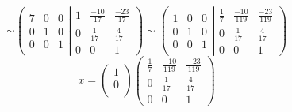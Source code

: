 \documentclass{article}
\begin{document}
\[
    \sim
    \left(\begin{array}{ccc}
            7 & 0 & 0 \\
            0 & 1 & 0 \\
            0 & 0 & 1
        \end{array}\left|
    \begin{array}{ccc}
            1 & \frac{-10}{17} & \frac{-23}{17} \\
            0 & \frac{1}{17}   & \frac{4}{17}   \\
            0 & 0              & 1
        \end{array}\right.
    \right)
    \sim
    \left(\begin{array}{ccc}
            1 & 0 & 0 \\
            0 & 1 & 0 \\
            0 & 0 & 1
        \end{array}\left|
    \begin{array}{ccc}
            \frac{1}{7} & \frac{-10}{119} & \frac{-23}{119} \\
            0           & \frac{1}{17}    & \frac{4}{17}    \\
            0           & 0               & 1
        \end{array}\right.
    \right)
\]
\[
    x=\left(\begin{array}{ccc}
            1 \\
            0 \\
        \end{array}\right)
    \left(\begin{array}{ccc}
            \frac{1}{7} & \frac{-10}{119} & \frac{-23}{119} \\
            0           & \frac{1}{17}    & \frac{4}{17}    \\
            0           & 0               & 1
        \end{array}\right)
\]
\end{document}
